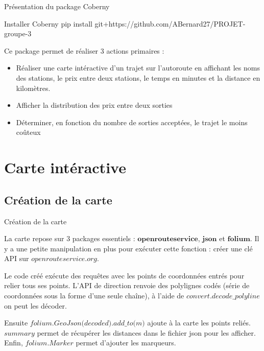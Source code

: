 \documentclass{beamer}
\begin{document}
\begin{frame}[fragile]{Présentation du package Coberny}
\begin{block}{Installer Coberny}
pip install git+https://github.com/ABernard27/PROJET-groupe-3
\end{block}
Ce package permet de réaliser 3 actions primaires : \newline
\begin{itemize}
\item Réaliser une carte intéractive d'un trajet sur l'autoroute en affichant les noms des stations, le prix entre deux stations, le temps en minutes et la distance en kilomètres.
\item Afficher la distribution des prix entre deux sorties
\item Déterminer, en fonction du nombre de sorties acceptées, le trajet le moins coûteux
\end{itemize}
\end{frame}



\section{Carte intéractive}
\subsection{Création de la carte}

\begin{frame}[fragile]{Création de la carte}

La carte repose sur 3 packages essentiels : $\textbf{openrouteservice}$, $\textbf{json}$ et $\textbf{folium}$. Il y a une petite manipulation en plus pour exécuter cette fonction : créer une clé API sur $\textit{openrouteservice.org}$. \newline
\pause

Le code créé exécute des requêtes avec les points de coordonnées entrés pour relier tous ses points. L'API de direction renvoie des polylignes codés (série de coordonnées sous la forme d'une seule chaîne), à l'aide de
$\textit{convert.decode\_polyline}$ on peut les décoder. \newline
\pause

Ensuite $\textit{folium.GeoJson(decoded).add\_to(m)}$ ajoute à la carte les points reliés. $\textit{summary}$ permet de récupérer les distances dans le fichier json pour les afficher. Enfin, $\textit{folium.Marker}$ permet d'ajouter les marqueurs.
\end{frame}
\end{document}

